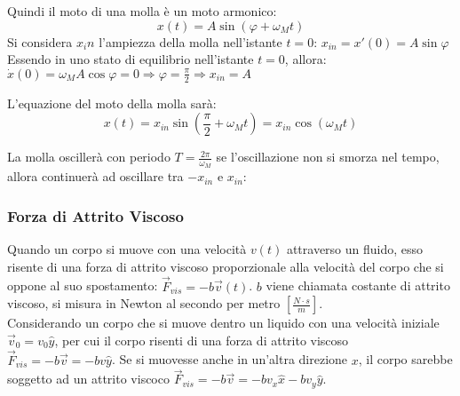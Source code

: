 \documentclass{article}
\numberwithin{equation}{subsection}
\begin{document}
Quindi il moto di una molla è un moto armonico:
\begin{equation*}
    x(t)=A\sin(\varphi + \omega_Mt)
\end{equation*}
Si considera $x_in$ l'ampiezza della molla nell'istante $t=0$:
$x_{in}=x'(0)=A\sin\varphi$
Essendo in uno stato di equilibrio nell'istante $t=0$, allora: 
$\dot x(0)=\omega_MA\cos\varphi=0\Rightarrow\varphi=\displaystyle\frac{\pi}{2}\Rightarrow x_{in}=A$

L'equazione del moto della molla sarà:
\begin{equation}
    x(t)=x_{in}\sin\left(\displaystyle\frac{\pi}{2}+\omega_Mt\right)=x_{in}\cos(\omega_Mt)
\end{equation}

La molla oscillerà con periodo $T=\displaystyle\frac{2\pi}{\omega_M}$ 
se l'oscillazione non si smorza nel tempo, allora 
continuerà ad oscillare tra $-x_{in}$ e $x_{in}$:

\begin{center}\end{center}

\subsubsection{Forza di Attrito Viscoso}
Quando un corpo si muove con una velocità $v(t)$ attraverso 
un fluido, esso risente di una forza di attrito viscoso 
proporzionale alla velocità del corpo che si oppone al 
suo spostamento: $\vec{F}_{vis}=-b\vec{v}(t)$. $b$ viene 
chiamata costante di attrito viscoso, si misura in Newton al 
secondo per metro $\left[\displaystyle\frac{N\cdot s}{m}\right]$.
\\
Considerando un corpo che si muove dentro un liquido con una velocità iniziale $\vec{v}_0=v_{0}\hat{y}$, per cui il corpo risenti di una forza di attrito viscoso $\vec{F}_{vis}=-b\vec{v}=-bv\hat{y}$. 
Se si muovesse anche in un'altra direzione $x$, il corpo sarebbe soggetto ad un attrito viscoco $\vec{F}_{vis}=-b\vec{v}=-bv_x\hat x -bv_y\hat y$. 
\end{document}
